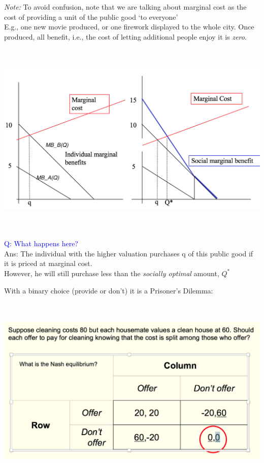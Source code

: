 \documentclass[]{article}
\begin{document}
\emph{Note:} To avoid confusion, note that we are talking about marginal cost as the cost of providing a unit of the public good `to everyone'\\
E.g., one new movie produced, or one firework displayed to the whole city.
Once produced, all benefit, i.e., the cost of letting additional people enjoy it is \emph{zero}.

\includegraphics[height=3.7in]{picsfigs/pgprovision2.png}

\textcolor{blue}{Q: What happens here?}\\
Ans: The individual with the higher valuation purchases q of this public good if it is priced at marginal cost.\\

However, he will still purchase less than the \emph{socially optimal} amount, \(Q^*\)

With a binary choice (provide or don't) it is a Prisoner's Dilemma:

\includegraphics[height=3.6in]{picsfigs/cleaningmatrix.png}
\end{document}
